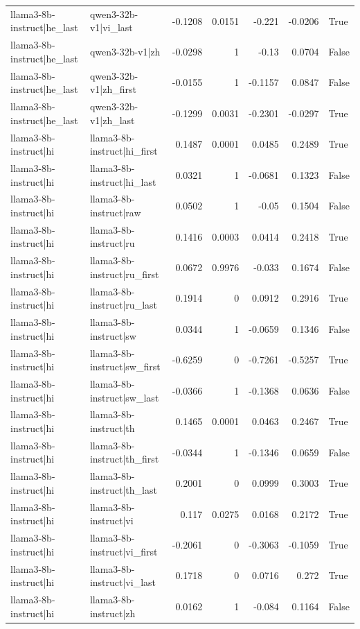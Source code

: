 \begin{table}
\begin{tabular}{l l r r r r l}
llama3-8b-instruct|he_last & qwen3-32b-v1|vi_last & -0.1208 & 0.0151 & -0.221 & -0.0206 & True \\
llama3-8b-instruct|he_last & qwen3-32b-v1|zh & -0.0298 & 1 & -0.13 & 0.0704 & False \\
llama3-8b-instruct|he_last & qwen3-32b-v1|zh_first & -0.0155 & 1 & -0.1157 & 0.0847 & False \\
llama3-8b-instruct|he_last & qwen3-32b-v1|zh_last & -0.1299 & 0.0031 & -0.2301 & -0.0297 & True \\
llama3-8b-instruct|hi & llama3-8b-instruct|hi_first & 0.1487 & 0.0001 & 0.0485 & 0.2489 & True \\
llama3-8b-instruct|hi & llama3-8b-instruct|hi_last & 0.0321 & 1 & -0.0681 & 0.1323 & False \\
llama3-8b-instruct|hi & llama3-8b-instruct|raw & 0.0502 & 1 & -0.05 & 0.1504 & False \\
llama3-8b-instruct|hi & llama3-8b-instruct|ru & 0.1416 & 0.0003 & 0.0414 & 0.2418 & True \\
llama3-8b-instruct|hi & llama3-8b-instruct|ru_first & 0.0672 & 0.9976 & -0.033 & 0.1674 & False \\
llama3-8b-instruct|hi & llama3-8b-instruct|ru_last & 0.1914 & 0 & 0.0912 & 0.2916 & True \\
llama3-8b-instruct|hi & llama3-8b-instruct|sw & 0.0344 & 1 & -0.0659 & 0.1346 & False \\
llama3-8b-instruct|hi & llama3-8b-instruct|sw_first & -0.6259 & 0 & -0.7261 & -0.5257 & True \\
llama3-8b-instruct|hi & llama3-8b-instruct|sw_last & -0.0366 & 1 & -0.1368 & 0.0636 & False \\
llama3-8b-instruct|hi & llama3-8b-instruct|th & 0.1465 & 0.0001 & 0.0463 & 0.2467 & True \\
llama3-8b-instruct|hi & llama3-8b-instruct|th_first & -0.0344 & 1 & -0.1346 & 0.0659 & False \\
llama3-8b-instruct|hi & llama3-8b-instruct|th_last & 0.2001 & 0 & 0.0999 & 0.3003 & True \\
llama3-8b-instruct|hi & llama3-8b-instruct|vi & 0.117 & 0.0275 & 0.0168 & 0.2172 & True \\
llama3-8b-instruct|hi & llama3-8b-instruct|vi_first & -0.2061 & 0 & -0.3063 & -0.1059 & True \\
llama3-8b-instruct|hi & llama3-8b-instruct|vi_last & 0.1718 & 0 & 0.0716 & 0.272 & True \\
llama3-8b-instruct|hi & llama3-8b-instruct|zh & 0.0162 & 1 & -0.084 & 0.1164 & False \\

\end{tabular}
\end{table}
